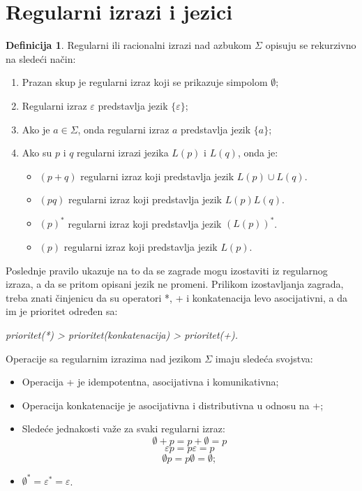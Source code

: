 \documentclass[12pt,oneside]{memoir}
\theoremstyle{plain}
\theoremstyle{definition}
\newtheorem{defn}{Definicija} %
\begin{document}
\section{Regularni izrazi i jezici}

\begin{defn}
Regularni ili racionalni izrazi nad azbukom $\Sigma$ opisuju se rekurzivno na sledeći način:
\begin{enumerate}
\item Prazan skup je regularni izraz koji se prikazuje simpolom $\emptyset$;
\item Regularni izraz $\varepsilon$ predstavlja jezik $\{\varepsilon\}$;
\item Ako je $a \in \Sigma$, onda regularni izraz $a$ predstavlja jezik $\{a\}$;
\item Ako su $p$ i $q$ regularni izrazi jezika $L(p)$ i $L(q)$, onda je:
	\begin{itemize}
	\item $(p+q)$ regularni izraz koji predstavlja jezik $L(p) \cup L(q)$.
	\item $(pq)$ regularni izraz koji predstavlja jezik $L(p)L(q)$.
	\item $(p)^*$ regularni izraz koji predstavlja jezik $(L(p))^*$.
	\item $(p)$ regularni izraz koji predstavlja jezik $L(p)$.
	\end{itemize}
\end{enumerate}
\end{defn}

Poslednje pravilo ukazuje na to da se zagrade mogu izostaviti iz regularnog izraza, a da se pritom opisani jezik ne promeni. Prilikom izostavljanja zagrada, treba znati činjenicu da su operatori *, + i konkatenacija levo asocijativni, a da im je prioritet određen sa:
\begin{center}
\textit{prioritet(*) > prioritet(konkatenacija) > prioritet(+).}
\end{center}

Operacije sa regularnim izrazima nad jezikom $\Sigma$ imaju sledeća svojstva:
\begin{itemize}
\item Operacija + je idempotentna, asocijativna i komunikativna;
\item Operacija konkatenacije je asocijativna i distributivna u odnosu na +;
\item Sledeće jednakosti važe za svaki regularni izraz:
$$\emptyset + p = p + \emptyset = p$$
$$\varepsilon p = p\varepsilon = p$$
$$\emptyset p = p\emptyset = \emptyset ;$$
\item $\emptyset^* = \varepsilon^* = \varepsilon$.
\end{itemize}
\end{document}
